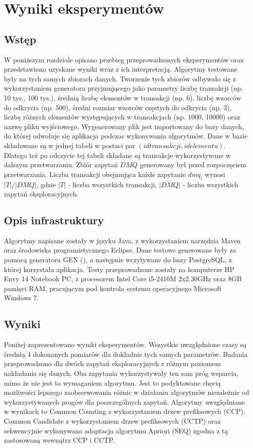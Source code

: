 \chapter{Wyniki eksperymentów}
\label{c5}

\section{Wstęp}
\label{c51}
W poniższym rozdziale opisano przebieg przeprowadzonych eksperymentów oraz przedstawiono uzyskane wyniki wraz z ich interpretacją. Algorytmy testowane były na tych samych zbiorach danych. Tworzenie tych zbiorów odbywało się z wykorzystaniem generatora przyjmującego jako parametry liczbę transakcji (np. 10 tys., 100 tys.), średnią liczbę elementów w transakcji (np. 6), liczbę wzorców do odkrycia (np. 500), średni rozmiar wzorców częstych do odkrycia (np. 3), liczbę różnych elementów występujących w transakcjach (np. 1000, 10000) oraz nazwę pliku wyjściowego. Wygenerowany plik jest importowany do bazy danych, do której odwołuje się aplikacja podczas wykonywania algorytmów. Dane w bazie składowane są w jednej tabeli w postaci par \((id transakcji, id elementu)\). Dlatego też po odczycie tej tabeli składane są transakcje wykorzystywane w dalszym przetwarzaniu. Zbiór zapytań \(DMQ\) generowany był przed rozpoczęciem przetwarzania. Liczba transakcji obejmująca każde zapytanie \(dmq_i\) wynosi \(|T|/|DMQ|\), gdzie \(|T|\) - liczba wszystkich transakcji, \(|DMQ|\) - liczba wszystkich zapytań eksploracyjnych. 

\section{Opis infrastruktury}
\label{c52}
Algorytmy napisane zostały w języku Java, z wykorzystaniem narzędzia Maven oraz środowiska programistycznego Eclipse. Dane testowe generowane były za pomocą generatora GEN (\cite{AgrawalGEN}), a następnie wczytywane do bazy PostgreSQL, z której korzystała aplikacja. Testy przeprowadzone zostały na komputerze HP Envy 14 Notebook PC, z procesorem Intel Core i5-2410M 2x2.30GHz oraz 8GB pamięci RAM, pracującym pod kontrola systemu operacyjnego Microsoft Windows 7. 

\section{Wyniki}
\label{c53}
Poniżej zaprezentowano wyniki eksperymentów. Wszystkie uwzględnione czasy są średnią 4 dokonanych pomiarów dla dokładnie tych samych parametrów. Badania przeprowadzono dla dwóch zapytań eksploracyjnych z różnym poziomem nakładania się danych. Oba zapytania wykorzystywały ten sam próg wsparcia, mimo że nie jest to wymaganiem algorytmu. Jest to podyktowane chęcią możliwości lepszego zaobserwowania różnic w działaniu algorytmów niezależnie od wykorzystywanych progów dla poszczególnych zapytań. Algorytmy uwzględniane w wynikach to Common Counting z wykorzystaniem drzew prefiksowych (CCP), Common Candidate z wykorzystaniem drzew prefiksowych (CCTP) oraz sekwencyjnie wykonywana adaptacja algorytmu Apriori (SEQ) zgodna z tą zastosowaną wewnątrz CCP i CCTP.

